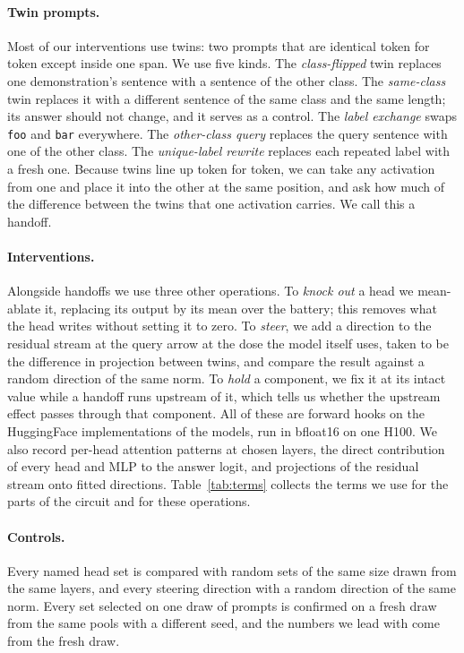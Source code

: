 \documentclass{article}
\begin{document}
\paragraph{Twin prompts.} Most of our interventions use twins: two prompts that are identical token for token except inside one span. We use five kinds. The \emph{class-flipped} twin replaces one demonstration's sentence with a sentence of the other class. The \emph{same-class} twin replaces it with a different sentence of the same class and the same length; its answer should not change, and it serves as a control. The \emph{label exchange} swaps \texttt{foo} and \texttt{bar} everywhere. The \emph{other-class query} replaces the query sentence with one of the other class. The \emph{unique-label rewrite} replaces each repeated label with a fresh one. Because twins line up token for token, we can take any activation from one and place it into the other at the same position, and ask how much of the difference between the twins that one activation carries. We call this a handoff.

\paragraph{Interventions.} Alongside handoffs we use three other operations. To \emph{knock out} a head we mean-ablate it, replacing its output by its mean over the battery; this removes what the head writes without setting it to zero. To \emph{steer}, we add a direction to the residual stream at the query arrow at the dose the model itself uses, taken to be the difference in projection between twins, and compare the result against a random direction of the same norm. To \emph{hold} a component, we fix it at its intact value while a handoff runs upstream of it, which tells us whether the upstream effect passes through that component. All of these are forward hooks on the HuggingFace implementations of the models, run in bfloat16 on one H100. We also record per-head attention patterns at chosen layers, the direct contribution of every head and MLP to the answer logit, and projections of the residual stream onto fitted directions. Table~\ref{tab:terms} collects the terms we use for the parts of the circuit and for these operations.

\paragraph{Controls.} Every named head set is compared with random sets of the same size drawn from the same layers, and every steering direction with a random direction of the same norm. Every set selected on one draw of prompts is confirmed on a fresh draw from the same pools with a different seed, and the numbers we lead with come from the fresh draw.
\end{document}
